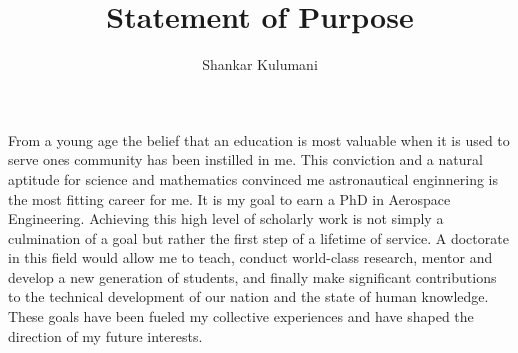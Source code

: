 \documentclass[12pt, oneside]{article}   	%
\title{Statement of Purpose}
\author{Shankar Kulumani}
\date{}							%
\begin{document}
\maketitle

\begin{comment}
On the first day of Astro 310, the introductory astronautics course at the US Air Force Academy, my professor asked bluntly, ``What have you learned so far?''
Some stated that they knew trigonometry; to which the professor replied `` Well, that brings you up to about the year 300 B.C.''
Another would reply that we had all learned calculus as well, which would be answered with another equally blunt statement of ``You're now all the way to about the 1700s.''
It was at this point where I finally realized that the wave of human knowledge continually moves forward and I want to lead it.
My goal is to obtain a PhD in Aerospace Engineering and attempt to contribute to the field in the same manner as all those who have come before me.
 \end{comment}

From a young age the belief that an education is most valuable when it is used to serve ones community has been instilled in me. 
This conviction and a natural aptitude for science and mathematics convinced me astronautical enginnering is the most fitting career for me.
It is my goal to earn a PhD in Aerospace Engineering.
Achieving this high level of scholarly work is not simply a culmination of a goal but rather the first step of a lifetime of service. 
A doctorate in this field would allow me to teach, conduct world-class research, mentor and develop a new generation of students, and finally make significant contributions to the technical development of our nation and the state of human knowledge.
These goals have been fueled my collective experiences and have shaped the direction of my future interests.
\end{document}

